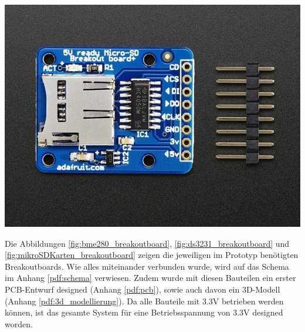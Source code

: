{\begin{minipage}[b][5cm][t]{0.3\textwidth}
\centering
\includegraphics[width=\textwidth]{graphics/prototyping/micro_sd_card_breakout.png} 
\label{fig:mikroSDKarten_breakoutboard}
\end{minipage}}

Die Abbildungen \ref{fig:bme280_breakoutboard}, \ref{fig:ds3231_breakoutboard} und \ref{fig:mikroSDKarten_breakoutboard} zeigen die jeweiligen im Prototyp benötigten Breakoutboards. Wie alles miteinander verbunden wurde, wird auf das Schema im Anhang \ref{pdf:schema} verwiesen. Zudem wurde mit diesen Bauteilen ein erster PCB-Entwurf designed (Anhang \ref{pdf:pcb}), sowie auch davon ein 3D-Modell (Anhang \ref{pdf:3d_modellierung}). Da alle Bauteile mit 3.3V betrieben werden können, ist das gesamte System für eine Betriebsspannung von 3.3V designed worden.

\newpage


